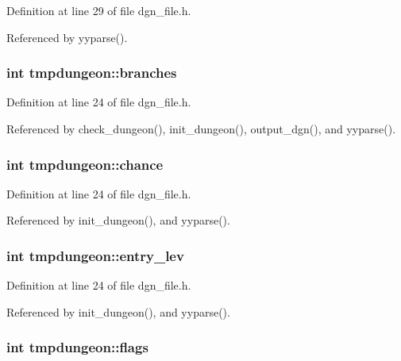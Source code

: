 Definition at line 29 of file dgn\+\_\+file.\+h.



Referenced by yyparse().

\hypertarget{structtmpdungeon_a98b40263b4773d613ce8e98598f5924b}{
\subsubsection[{branches}]{\setlength{\rightskip}{0pt plus 5cm}int tmpdungeon\+::branches}}\label{structtmpdungeon_a98b40263b4773d613ce8e98598f5924b}


Definition at line 24 of file dgn\+\_\+file.\+h.



Referenced by check\+\_\+dungeon(), init\+\_\+dungeon(), output\+\_\+dgn(), and yyparse().

\hypertarget{structtmpdungeon_a694d5229dbc54691792983a89c54717e}{
\subsubsection[{chance}]{\setlength{\rightskip}{0pt plus 5cm}int tmpdungeon\+::chance}}\label{structtmpdungeon_a694d5229dbc54691792983a89c54717e}


Definition at line 24 of file dgn\+\_\+file.\+h.



Referenced by init\+\_\+dungeon(), and yyparse().

\hypertarget{structtmpdungeon_aea3606dba7db6efd221b5f87558368f9}{
\subsubsection[{entry\+\_\+lev}]{\setlength{\rightskip}{0pt plus 5cm}int tmpdungeon\+::entry\+\_\+lev}}\label{structtmpdungeon_aea3606dba7db6efd221b5f87558368f9}


Definition at line 24 of file dgn\+\_\+file.\+h.



Referenced by init\+\_\+dungeon(), and yyparse().

\hypertarget{structtmpdungeon_a74d4c51688298b07b0f2daa838f219e3}{
\subsubsection[{flags}]{\setlength{\rightskip}{0pt plus 5cm}int tmpdungeon\+::flags}}\label{structtmpdungeon_a74d4c51688298b07b0f2daa838f219e3}



